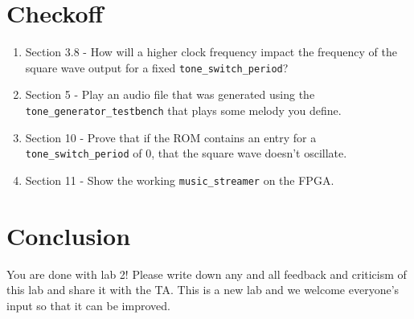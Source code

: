 \documentclass[11pt]{article}
\begin{document}
\section{Checkoff}
\begin{enumerate}
	\item Section 3.8 - How will a higher clock frequency impact the frequency of the square wave output for a fixed \verb|tone_switch_period|?
	\item Section 5 - Play an audio file that was generated using the \verb|tone_generator_testbench| that plays some melody you define.
	\item Section 10 - Prove that if the ROM contains an entry for a \verb|tone_switch_period| of 0, that the square wave doesn't oscillate.
	\item Section 11 - Show the working \verb|music_streamer| on the FPGA.
\end{enumerate}

\section{Conclusion}
You are done with lab 2! Please write down any and all feedback and criticism of this lab and share it with the TA. This is a new lab and we welcome everyone's input so that it can be improved.
\end{document}
